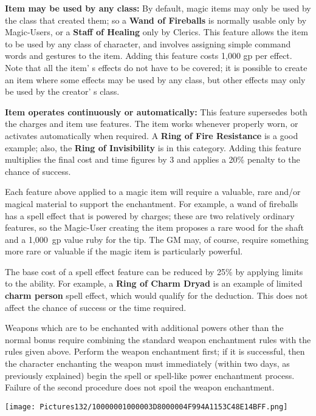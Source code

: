 \documentclass[a4paper,twoside,openany,10pt]{book}
\begin{document}
\begin{multicols}{2}
\textbf{Item may be used by any class:} By default, magic items may only be used by the class that created them; so a \textbf{Wand of Fireballs} is normally usable only by Magic-Users, or a \textbf{Staff of Healing} only by Clerics. This feature allows the item to be used by any class of character, and involves assigning simple command words and gestures to the item. Adding this feature costs 1,000 gp per effect. Note that all the item' s effects do not have to be covered; it is possible to create an item where some effects may be used by any class, but other effects may only be used by the creator' s class.


\textbf{Item operates continuously or automatically:} This feature supersedes both the charges and item use features. The item works whenever properly worn, or activates automatically when required. A \textbf{Ring of Fire Resistance} is a good example; also, the \textbf{Ring of Invisibility} is in this category. Adding this feature multiplies the final cost and time figures by 3 and applies a 20\% penalty to the chance of success. 

Each feature above applied to a magic item will require a valuable, rare and/or magical material to support the enchantment. For example, a wand of fireballs has a spell effect that is powered by charges; these are two relatively ordinary features, so the Magic-User creating the item proposes a rare wood for the shaft and a 1,000~gp value ruby for the tip. The GM may, of course, require something more rare or valuable if the magic item is particularly powerful.

The base cost of a spell effect feature can be reduced by 25\% by applying limits to the ability. For example, a \textbf{Ring of Charm Dryad} is an example of limited \textbf{charm person} spell effect, which would qualify for the deduction. This does not affect the chance of success or the time required.

Weapons which are to be enchanted with additional powers other than the normal bonus require combining the standard weapon enchantment rules with the rules given above. Perform the weapon enchantment first; if it is successful, then the character enchanting the weapon must immediately (within two days, as previously explained) begin the spell or spell-like power enchantment process. Failure of the second procedure does not spoil the weapon enchantment.


\begin{center}
	\texttt{[image: Pictures132/10000001000003D8000004F994A1153C48E14BFF.png]}
\end{center}


\end{multicols}
\end{document}
